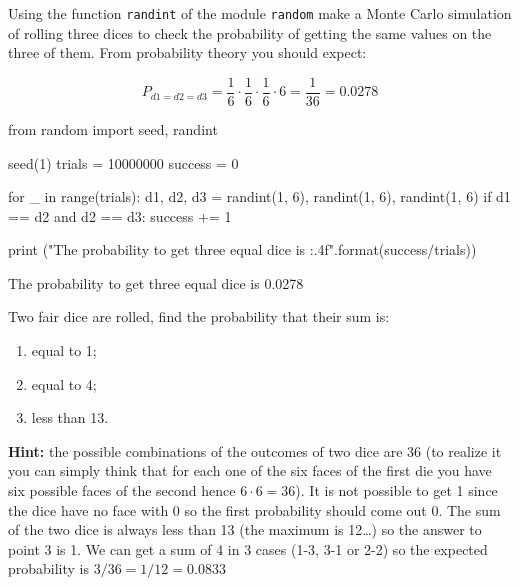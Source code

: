 \begin{question}
Using the function \texttt{randint} of the module \texttt{random} make a Monte Carlo simulation of rolling three dices to check the probability of getting the same values on the three of them.
From probability theory you should expect:

\[P_{d1=d2=d3} = \frac{1}{6}\cdot\frac{1}{6}\cdot\frac{1}{6}\cdot 6 = \frac{1}{36} = 0.0278\]
\end{question}

\cprotEnv\begin{solution}
\begin{ipython}
from random import seed, randint

seed(1)
trials = 10000000
success = 0

for _ in range(trials):
    d1, d2, d3 = randint(1, 6), randint(1, 6), randint(1, 6)
    if d1 == d2 and d2 == d3:
        success += 1

print ("The probability to get three equal dice is {:.4f}".format(success/trials))
\end{ipython}
\begin{ioutput}
The probability to get three equal dice is 0.0278
\end{ioutput}
\end{solution}

\begin{question}
Two fair dice are rolled, find the probability that their sum is:
\begin{enumerate}[start=1]
	\item equal to 1;
	\item equal to 4;
	\item less than 13.
\end{enumerate}
	
\noindent\textbf{Hint:} the possible combinations of the outcomes of two dice are 36 (to realize it you can simply think that for each one of the six faces of the first die you have six possible faces of the second hence $6\cdot 6=36$). It is not possible to get 1 since the dice have no face with 0 so the first probability should come out 0. The sum of the two dice is always less than 13 (the maximum is 12\ldots) so the answer to point 3 is 1. We can get a sum of 4 in 3 cases (1-3, 3-1 or 2-2) so the expected probability is $3/36=1/12=0.0833$
\end{question}

